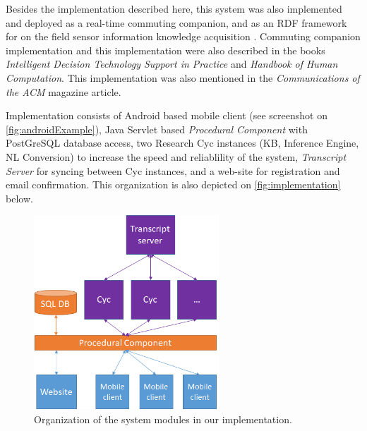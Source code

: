 Besides the implementation described here, this system was also implemented and
deployed as a real-time commuting companion\parencite{Figueiras2013}, and as an
RDF framework for on the field sensor information knowledge acquisition
\parencite{Bradesko2012a}. Commuting companion implementation and this implementation
were also described in the books \emph{Intelligent Decision Technology 
Support in Practice}\parencite{Costa2016} and \emph{Handbook of Human 
Computation}\parencite{Witbrock2013}. This implementation was also mentioned
in the \emph{Communications of the ACM} magazine article\parencite{Geller2016}.

Implementation consists of Android based mobile client (see screenshot on
\autoref{fig:androidExample}), Java Servlet based
\emph{Procedural Component} with PostGreSQL database access, two Research 
Cyc instances 
(KB, Inference Engine, NL Conversion) to increase the speed and reliablility 
of the system, \emph{Transcript Server} for syncing between Cyc instances, 
and a web-site for registration and email confirmation. This organization is 
also depicted on \autoref{fig:implementation} below.

\begin{figure}[H]
	\centering
		\includegraphics[width=0.62\textwidth]{figures/implementationOrg.png}
	\caption{Organization of the system modules in our implementation.}
	\label{fig:implementation}
\end{figure}

